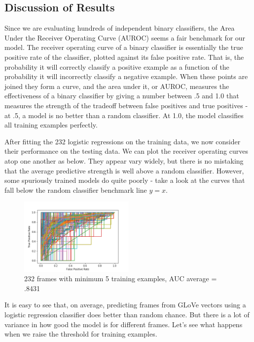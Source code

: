 \documentclass[a4paper]{article}
\begin{document}
\subsection{Discussion of Results}

Since we are evaluating hundreds of independent binary classifiers, the Area Under the Receiver Operating Curve (AUROC) seems a fair benchmark for our model. The receiver operating curve of a binary classifier is essentially the true positive rate of the classifier, plotted against its false positive rate. That is, the probability it will correctly classify a positive example as a function of the probability it will incorrectly classify a negative example. When these points are joined they form a curve, and the area under it, or AUROC, measures the effectiveness of a binary classifier by giving a number between .5 and 1.0 that measures the strength of the tradeoff between false positives and true positives - at .5, a model is no better than a random classifier. At 1.0, the model classifies all training examples perfectly. 

After fitting the 232 logistic regressions on the training data, we now consider their performance on the testing data. We can plot the receiver operating curves atop one another as below. They appear vary widely, but there is no mistaking that the average predictive strength is well above a random classifier. However, some spuriously trained models do quite poorly - take a look at the curves that fall below the random classifier benchmark line $y = x$.  

\begin{figure}[H]
\centering
\includegraphics[width=0.5\textwidth]{AUC_plot5.png}
\caption{\label{fig:frog} 232 frames with minimum 5 training examples, AUC average = .8431}
\end{figure}

It is easy to see that, on average, predicting frames from GLoVe vectors using a logistic regression classifier does better than random chance. But there is a lot of variance in how good the model is for different frames. Let's see what happens when we raise the threshold for training examples.
\end{document}
